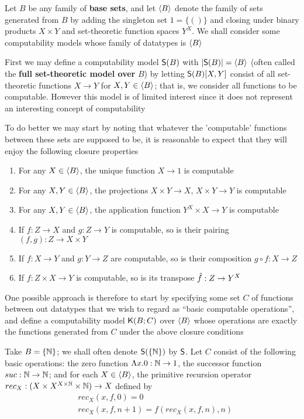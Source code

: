 \documentclass[11pt]{article}
\begin{document}
\begin{examplle}[]
\label{3.1.7}
Let \(B\) be any family of \textbf{base sets}, and let \(\langle B\rangle\) denote the family of sets generated
from \(B\) by adding the singleton set \(1=\{()\}\) and closing under binary products \(X\times Y\) and
set-theoretic function spaces \(Y^X\). We shall consider some computability models whose family
of datatypes is \(\langle B\rangle\)

First we may define a computability model \(\textsf{S}(B)\) with \(\abs{\sfS(B)}=\la B\ra\) (often called
the \textbf{full set-theoretic model over} \(B\)) by letting \(\textsf{S}(B)[X,Y]\) consist of all
set-theoretic functions \(X\to Y\) for \(X,Y\in\langle B\rangle\); that is, we consider all functions to be
computable. However this model is of limited interest since it does not represent an interesting
concept of computability

To do better we may start by noting that whatever the 'computable' functions between these sets
are supposed to be, it is reasonable to expect that they will enjoy the following closure
properties
\begin{enumerate}
\item For any \(X\in\langle B\rangle\), the unique function \(X\to 1\) is computable
\item For any \(X,Y\in\langle B\rangle\), the projections \(X\times Y\to X\), \(X\times Y\to Y\) is computable
\item For any \(X,Y\in\langle B\rangle\), the application function \(Y^X\times X\to Y\) is computable
\item If \(f:Z\to X\) and \(g:Z\to Y\) is computable, so is their pairing \((f,g):Z\to X\times Y\)
\item If \(f:X\to Y\) and \(g:Y\to Z\) are computable, so is their composition \(g\circ f:X\to Z\)
\item If \(f:Z\times X\to Y\) is computable, so is its transpose \(\hat{f}:Z\to Y^X\)
\end{enumerate}


One possible approach is therefore to start by specifying some set \(C\) of functions between
out datatypes that we wish to regard as ``basic computable operations'', and define a
computability model \(\textsf{K}(B;C)\) over \(\langle B\rangle\) whose operations are exactly the functions
generated from \(C\) under the above closure conditions

Take \(B=\{\mathbb{N}\}\); we shall often denote \(\textsf{S}(\{\mathbb{N}\})\) by \(\textsf{S}\). Let \(C\) consist of the
following basic operations: the zero function \(\Lambda x.0:\mathbb{N}\to 1\), the successor function \(suc:\mathbb{N}\to\mathbb{N}\);
and for each \(X\in\langle B\rangle\), the primitive recursion operator \(rec_X:(X\times X^{X\times\mathbb{N}}\times\mathbb{N})\to X\) defined by
\begin{align*}
&rec_X(x,f,0)=0\\
&rec_X(x,f,n+1)=f(rec_X(x,f,n),n)
\end{align*}
\end{examplle}
\end{document}

